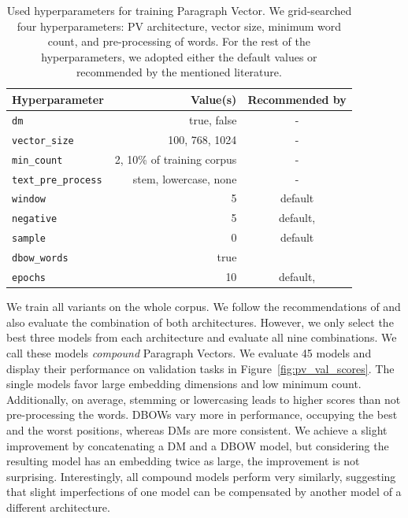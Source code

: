 \begin{table}
  \footnotesize
  \centering
  \begin{tabular}{lrc}
    \toprule
    Hyperparameter & Value(s) & Recommended by \\
    \midrule
    \texttt{dm} & true, false & - \\
    \texttt{vector\_size} & 100, 768, 1024 & - \\
    \texttt{min\_count} & 2, 10\% of training corpus& - \\
    \texttt{text\_pre\_process} & stem, lowercase, none & - \\
    \texttt{window} & 5 & default \\
    \texttt{negative} & 5 & default, \cite{lau2016empirical} \\
    \texttt{sample} & 0 & default \\
    \texttt{dbow\_words} & true & \cite{lau2016empirical} \\
    \texttt{epochs} & 10 & default, \cite{dai2015document} \\
    \bottomrule
  \end{tabular}

  \caption{Used hyperparameters for training Paragraph Vector. We grid-searched
  four hyperparameters: PV architecture, vector size, minimum word count, and
  pre-processing of words. For the rest of the hyperparameters, we adopted either the
  default values or recommended by the mentioned literature.}

  \label{table:pv_hyperparams}

\end{table}

We train all variants on the whole  corpus. We follow the
recommendations of \cite{le2014distributed} and also evaluate the combination
of both architectures. However, we only select the best three models from each
architecture and evaluate all nine combinations. We call these models
\emph{compound} Paragraph Vectors. We evaluate 45 models and display their
performance on validation tasks in Figure~\ref{fig:pv_val_scores}.
The single models favor large embedding dimensions and low minimum count.
Additionally, on average, stemming or lowercasing leads to higher scores than
not pre-processing the words. DBOWs vary more in performance, occupying the
best and the worst positions, whereas DMs are more consistent. We achieve a
slight improvement by concatenating a DM and a DBOW model, but considering the
resulting model has an embedding twice as large, the improvement is not
surprising. Interestingly, all compound models perform very similarly,
suggesting that slight imperfections of one model can be compensated by another
model of a different architecture.

